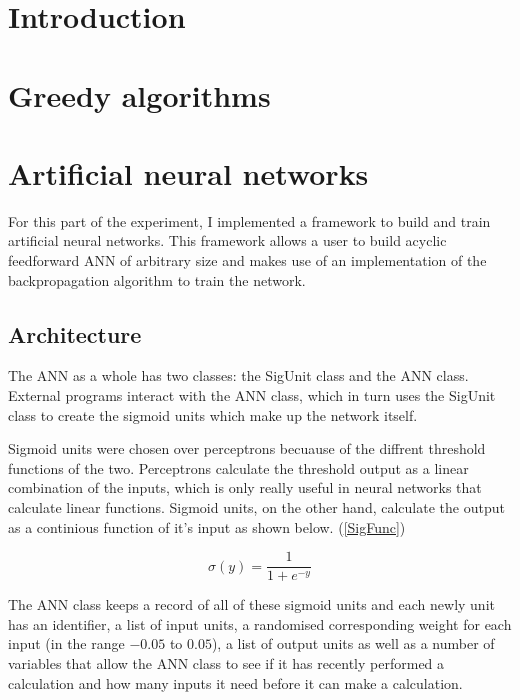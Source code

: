 \documentclass[11pt]{article}
\theoremstyle{definition}
\begin{document}
  \tableofcontents

  \newpage

  \section{Introduction}

  \section{Greedy algorithms}

  \section{Artificial neural networks}
    For this part of the experiment, I implemented a framework to build and train artificial neural networks.
    This framework allows a user to build acyclic feedforward ANN of arbitrary size and makes
    use of an implementation of the backpropagation algorithm to train the network.

    \subsection{Architecture}
      The ANN as a whole has two classes: the SigUnit class and the ANN class.
      External programs interact with the ANN class, which in turn uses the SigUnit class to create the
      sigmoid units which make up the network itself.

      Sigmoid units were chosen over perceptrons becuause of the diffrent threshold functions of the two.
      Perceptrons calculate the threshold output as a linear combination of the inputs, which is only 
      really useful in neural networks that calculate linear functions. Sigmoid units, on the other hand, calculate
      the output as a continious function of it's input as shown below.\cite{Mitchell.97} (\ref{SigFunc})

      \begin{equation} \label{SigFunc} 
        \sigma(y) = \frac{1}{1+e^{-y}}
      \end{equation}  

      The ANN class keeps a record of all of these sigmoid units and each newly unit has an
      identifier, a list
      of input units, a randomised corresponding weight for each input (in the range $-0.05$ to $0.05$), a
      list of output units as well as a number of variables that allow the ANN class to see if it has 
      recently performed a calculation and how many inputs it need before it can make a calculation.
\end{document}
